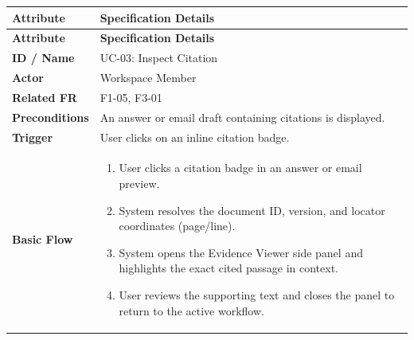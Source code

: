 \begin{longtable}{>{\raggedright\arraybackslash}p{}>{\raggedright\arraybackslash}p{}}

\hline

\rowcolor{tablehead}

\textbf{Attribute} & \textbf{Specification Details} \\ \hline

\endfirsthead

\hline

\rowcolor{tablehead}

\textbf{Attribute} & \textbf{Specification Details} \\ \hline

\endhead

\endfoot

\endlastfoot

\textbf{ID / Name} & UC-03: Inspect Citation \\ \hline

\textbf{Actor} & Workspace Member \\ \hline

\textbf{Related FR} & F1-05, F3-01 \\ \hline

\textbf{Preconditions} & An answer or email draft containing citations is displayed. \\ \hline

\textbf{Trigger} & User clicks on an inline citation badge. \\ \hline

\textbf{Basic Flow} & \begin{enumerate}[nosep,leftmargin=*,label=\arabic*.]

    \item User clicks a citation badge in an answer or email preview.

    \item System resolves the document ID, version, and locator coordinates (page/line).

    \item System opens the Evidence Viewer side panel and highlights the exact cited passage in context.

    \item User reviews the supporting text and closes the panel to return to the active workflow.

\end{enumerate} \\ \hline


\end{longtable}
